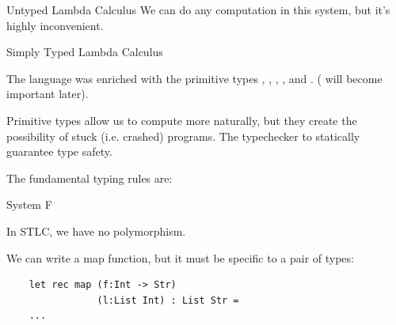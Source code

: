 \documentclass[portrait,final,paperwidth=40in,paperheight=40in]{baposter}
\begin{document}
{\begin{poster}
\begin{posterbox}[name=untyped,below=overview]{Untyped Lambda Calculus}
  We can do any computation in this system, but it's highly inconvenient.

  \end{posterbox}

  \begin{posterbox}[name=simple,below=untyped]{Simply Typed Lambda Calculus}
    
  The language was enriched with the primitive types , , ,
  , and . ( will become important later).

  Primitive types allow us to compute more naturally, but they create the possibility
  of stuck (i.e. crashed) programs. The typechecker to statically guarantee type safety.

  The fundamental typing rules are:


  \begin{prooftree}
  \end{prooftree}

  \begin{prooftree}
  \end{prooftree}

  \begin{prooftree}
  \end{prooftree}

  \vspace{0.3em}
  \end{posterbox}

  \begin{posterbox}[name=poly,column=1]{System F}
  
  In STLC, we have no polymorphism.

  We can write a map function, but it must be specific to a pair of types:

  \begin{lstlisting}
    let rec map (f:Int -> Str)
                (l:List Int) : List Str =
    ...
  \end{lstlisting}


\end{posterbox}
\end{poster}}
\end{document}
